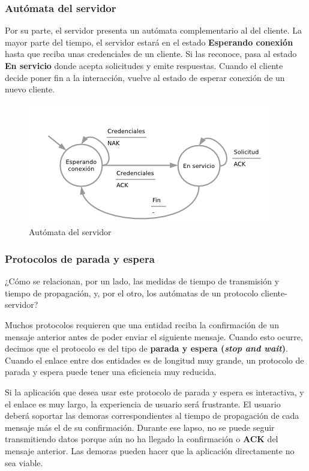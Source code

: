 \documentclass[spanish,A4,]{article}
\begin{document}
\subsubsection{Autómata del servidor}\label{autuxf3mata-del-servidor}

Por su parte, el servidor presenta un autómata complementario al del
cliente. La mayor parte del tiempo, el servidor estará en el estado
\textbf{Esperando conexión} hasta que reciba unas credenciales de un
cliente. Si las reconoce, pasa al estado \textbf{En servicio} donde
acepta solicitudes y emite respuestas. Cuando el cliente decide poner
fin a la interacción, vuelve al estado de esperar conexión de un nuevo
cliente.

\begin{figure}[htbp]
\centering
\includegraphics{img/protocolo-servidor.png}
\caption{Autómata del servidor}
\end{figure}

\subsubsection{Protocolos de parada y
espera}\label{protocolos-de-parada-y-espera}

¿Cómo se relacionan, por un lado, las medidas de tiempo de transmisión y
tiempo de propagación, y, por el otro, los autómatas de un protocolo
cliente-servidor?

Muchos protocolos requieren que una entidad reciba la confirmación de un
mensaje anterior antes de poder enviar el siguiente mensaje. Cuando esto
ocurre, decimos que el protocolo es del tipo de \textbf{parada y espera
(\emph{stop and wait})}. Cuando el enlace entre dos entidades es de
longitud muy grande, un protocolo de parada y espera puede tener una
eficiencia muy reducida.

Si la aplicación que desea usar este protocolo de parada y espera es
interactiva, y el enlace es muy largo, la experiencia de usuario será
frustrante. El usuario deberá soportar las demoras correspondientes al
tiempo de propagación de cada mensaje más el de su confirmación. Durante
ese lapso, no se puede seguir transmitiendo datos porque aún no ha
llegado la confirmación o \textbf{ACK} del mensaje anterior. Las demoras
pueden hacer que la aplicación directamente no sea viable.
\end{document}

